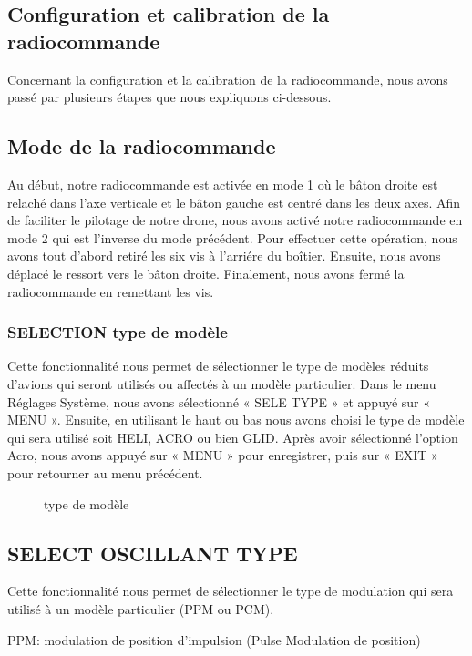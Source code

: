 	\subsection{Configuration et calibration de la radiocommande}
	Concernant la configuration et la calibration de la radiocommande, nous avons passé par plusieurs étapes que nous expliquons ci-dessous. 
	\subsection{Mode de la radiocommande}
	Au début, notre radiocommande est activée en mode 1 où le bâton droite est relaché dans l'axe verticale et le bâton gauche est centré dans les deux axes. Afin de faciliter le pilotage de notre drone, nous avons activé notre radiocommande en mode 2  qui est l'inverse du mode précédent. Pour effectuer cette opération, nous avons tout d'abord retiré les six vis à l'arriére du boîtier. Ensuite, nous avons déplacé le ressort vers le bâton droite.  Finalement, nous avons fermé la radiocommande en remettant les vis.
	
	
	\subsubsection{SELECTION type de modèle}
	Cette fonctionnalité nous permet de sélectionner le type de modèles réduits d'avions qui seront utilisés ou affectés à un modèle particulier.
	Dans le menu Réglages Système, nous avons sélectionné « SELE TYPE » et appuyé sur « MENU ». Ensuite, en utilisant le haut ou bas nous avons choisi le type de modèle qui sera utilisé soit HELI, ACRO ou bien GLID. Après avoir sélectionné l'option Acro, nous avons appuyé sur « MENU  » pour enregistrer, puis sur « EXIT » pour retourner au menu précédent.
	
	\begin{figure}[h]
		\begin{center}
			\centering
		\end{center}
		\caption{type de modèle}
	\end{figure}
\subsection{ SELECT OSCILLANT TYPE}
Cette fonctionnalité nous permet de sélectionner le type de modulation qui sera utilisé à un modèle particulier (PPM ou PCM).


PPM: modulation de position d'impulsion (Pulse Modulation de position) 

